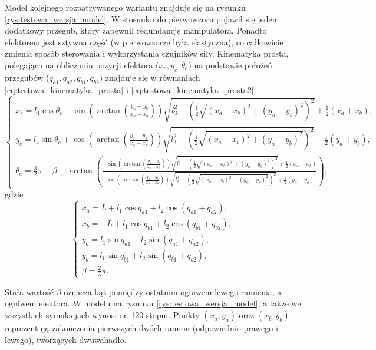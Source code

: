 \documentclass[printmode]{mgr}
\begin{document}
Model kolejnego rozpatrywanego wariantu znajduje się na rysunku \ref{rys:testowa_wersja_model}. W stosunku do pierwowzoru pojawił
się jeden dodatkowy przegub, który zapewnił redundancję manipulatora. Ponadto efektorem jest sztywna część (w pierwowzorze była elastyczna),
co całkowicie zmienia sposób sterowania i wykorzystania czujników siły. Kinematyka prosta, polegająca
na obliczaniu pozycji efektora ($x_e, y_e, \theta_e$) na podstawie położeń przegubów ($q_{a1}, q_{a2}, q_{b1}, q_{b2}$)
znajduje się w równaniach \ref{eq:testowa_kinematyka_prosta} i \ref{eq:testowa_kinematyka_prosta2}.
\begin{equation}
\begin{cases}
x_e = l_4\cos\theta_e - \sin(\arctan(\frac{y_a-y_b}{x_a-x_b}))\sqrt{l_3^2-(\frac{1}{2}\sqrt{(x_a-x_b)^2+(y_a-y_b)^2})^2} + \frac{1}{2}(x_a+x_b),\\
y_e = l_4\sin\theta_e + \cos(\arctan(\frac{y_a-y_b}{x_a-x_b}))\sqrt{l_3^2-(\frac{1}{2}\sqrt{(x_a-x_b)^2+(y_a-y_b)^2})^2} + \frac{1}{2}(y_a+y_b),\\
\theta_e = \frac{3}{2}\pi - \beta - \arctan(\frac{- \sin(\arctan(\frac{y_a-y_b}{x_a-x_b}))\sqrt{l_3^2-(\frac{1}{2}\sqrt{(x_a-x_b)^2+(y_a-y_b)^2})^2} + \frac{1}{2}(x_a-x_b)}{\cos(\arctan(\frac{y_a-y_b}{x_a-x_b}))\sqrt{l_3^2-(\frac{1}{2}\sqrt{(x_a-x_b)^2+(y_a-y_b)^2})^2} + \frac{1}{2}(y_a-y_b)}) ,
\end{cases}
\label{eq:testowa_kinematyka_prosta}
\end{equation}
gdzie
\begin{equation}
\begin{cases}
x_a = L + l_1\cos q_{a1} + l_2 \cos(q_{a1}+q_{a2}),\\
x_b = -L + l_1\cos q_{b1} + l_2 \cos(q_{b1}+q_{b2}),\\
y_a = l_1\sin q_{a1} + l_2 \sin(q_{a1}+q_{a2}),\\
y_b = l_1\sin q_{b1} + l_2 \sin(q_{b1}+q_{b2}),\\
\beta = \frac{2}{3}\pi.
\end{cases}
\label{eq:testowa_kinematyka_prosta2}
\end{equation}

Stała wartość $\beta$ oznacza kąt pomiędzy ostatnim ogniwem lewego ramienia, a ogniwem efektora. W modelu na rysunku \ref{rys:testowa_wersja_model},
a także we wszystkich symulacjach wynosi on 120 stopni. Punkty $(x_a, y_a)$ oraz $(x_b, y_b)$ reprezentują zakończenia pierwszych
dwóch ramion (odpowiednio prawego i lewego), tworzących dwuwahadło.
\end{document}
